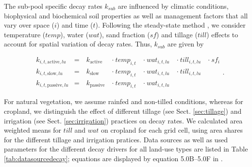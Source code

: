 \documentclass[gc, manuscript]{copernicus}
\begin{document}
The sub-pool specific decay rates \(k_{sub}\) are influenced by climatic conditions, biophysical and biochemical soil properties as well as management factors that all vary over space (\(i\)) and time (\(t\)). Following the steady-state method \citep{calvo_buendia_ipcc_2019}, we consider temperature (\(temp\)), water (\(wat\)), sand fraction (\(sf\)) and tillage (\(till\)) effects to account for spatial variation of decay rates. Thus, \(k_{sub}\) are given by

\begin{equation}
\begin{aligned}
& k_{i,t,\mathrm{active},lu}  & = &~ k_{\mathrm{active}}  ~ &\cdot~ temp_{i,t} ~ &\cdot~ wat_{i,t,lu} ~ &\cdot~ till_{i,t,lu} ~ & \cdot~ sf_{i}\\
& k_{i,t,\mathrm{slow},lu}    & = &~ k_{\mathrm{slow}}    ~ &\cdot~ temp_{i,t} ~ &\cdot~ wat_{i,t,lu} ~ &\cdot~ till_{i,t,lu} ~ &\\
& k_{i,t,\mathrm{passive},lu} & = &~ k_{\mathrm{passive}} ~ &\cdot~ temp_{i,t} ~ &\cdot~ wat_{i,t,lu} ~ & ~ & 
\label{eq:decayrates}
\end{aligned}.
\end{equation}

For natural vegetation, we assume rainfed and non-tilled conditions, whereas for cropland, we distinguish the effect of different tillage (see Sect. \ref{sec:tillage}) and irrigation (see Sect. \ref{sec:irrigation}) practices on decay rates. We calculated area weighted means for \(till\) and \(wat\) on cropland for each grid cell, using area shares for the different tillage and irrigation pratices. Data sources as well as used parameters for the different decay drivers for all land-use types are listed in Table \ref{tab:datasourcedecay}; equations are displayed by equation 5.0B--5.0F in \citep{calvo_buendia_ipcc_2019}.
\end{document}
